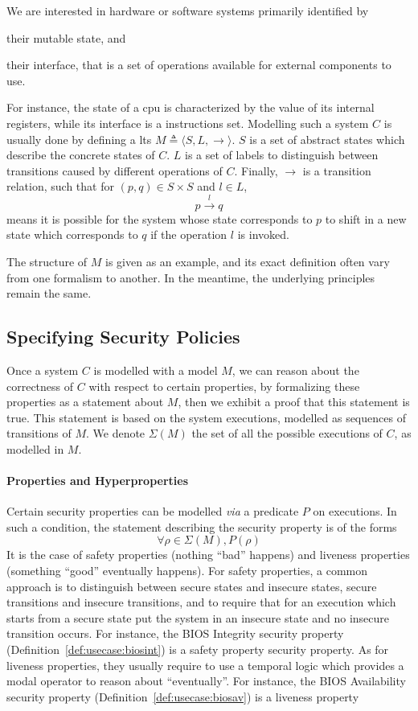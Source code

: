 We are interested in hardware or software systems primarily identified by
%
\begin{inparaenum}[(1)]
\item their mutable state, and
%
\item their interface, that is a set of operations available for external
  components to use.
\end{inparaenum}
%
For instance, the state of a \ac{cpu} is characterized by the value of its
internal registers, while its interface is a instructions set.
%
Modelling such a system $C$ is usually done by defining a \ac{lts}
$M \triangleq \langle S, L, \rightarrow \rangle$.
%
$S$ is a set of abstract states which describe the concrete states of $C$.
%
$L$ is a set of labels to distinguish between transitions caused by different
operations of $C$.
%
Finally, $\rightarrow$ is a transition relation, such that for
$(p, q) \in S \times S$ and $l \in L$,
%
\[ p \xrightarrow{l} q \]
%
means it is possible for the system whose state corresponds to $p$ to shift in a
new state which corresponds to $q$ if the operation $l$ is invoked.

The structure of $M$ is given as an example, and its exact definition often vary
from one formalism to another.
%
In the meantime, the underlying principles remain the same.

\subsection{Specifying Security Policies}
\label{subsec:state:secu}

Once a system $C$ is modelled with a model $M$, we can reason about the
correctness of $C$ with respect to certain properties, by formalizing these
properties as a statement about $M$, then we exhibit a proof that this statement
is true.
%
This statement is based on the system executions, modelled as sequences of
transitions of $M$.
%
We denote $\Sigma(M)$ the set of all the possible executions of $C$, as modelled
in $M$.

\paragraph{Properties and Hyperproperties}
%
Certain security properties can be modelled \emph{via} a predicate $P$ on
executions.
%
In such a condition, the statement describing the security property is of the
forms
%
\[
  \forall \rho \in \Sigma(M), P(\rho)
\]
%
It is the case of safety properties (nothing ``bad'' happens) and liveness
properties (something ``good'' eventually happens).
%
For safety properties, a common approach is to distinguish between secure states
and insecure states, secure transitions and insecure transitions, and to require
that for an execution which starts from a secure state put the system in an
insecure state and no insecure transition occurs.
%
For instance, the BIOS Integrity security property
(Definition~\ref{def:usecase:biosint}) is a safety property security property.
%
As for liveness properties, they usually require to use a temporal logic which
provides a modal operator to reason about ``eventually''.
%
For instance, the BIOS Availability security property
(Definition~\ref{def:usecase:biosav}) is a liveness property

